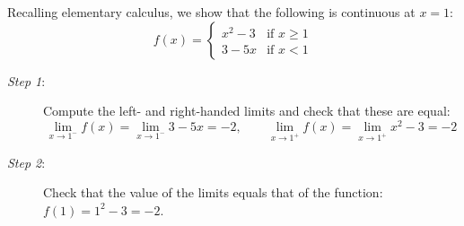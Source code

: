 

\begin{example}{}{}
	Recalling elementary calculus, we show that the following is continuous at $x=1$:
	\[
		f(x)=
		\begin{cases}
			x^2-3&\text{if }x\ge 1\\
			3-5x&\text{if }x<1
		\end{cases}
	\]
	\begin{description}
	  \item[\normalfont\emph{Step 1}:] Compute the left- and right-handed limits and check that these are equal:
	  \[
	  	\lim\limits_{x\to 1^-}f(x)=\lim\limits_{x\to 1^-}3-5x=-2,\qquad  
	  	\lim\limits_{x\to 1^+}f(x)=\lim\limits_{x\to 1^+}x^2-3=-2
	  \]
	  \item[\normalfont\emph{Step 2}:] Check that the value of the limits equals that of the function: $f(1)=1^2-3=-2$.
	\end{description}
\end{example}

\goodbreak



